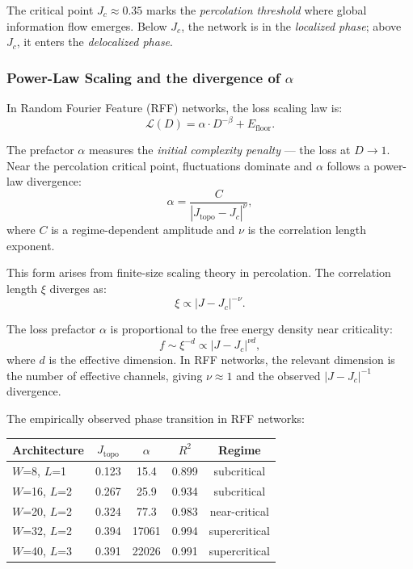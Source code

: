 The critical point $J_c \approx 0.35$ marks the \emph{percolation threshold} where global information flow emerges. Below $J_c$, the network is in the \emph{localized phase}; above $J_c$, it enters the \emph{delocalized phase}.

\subsubsection{Power-Law Scaling and the divergence of $\alpha$}

In Random Fourier Feature (RFF) networks, the loss scaling law is:
\begin{equation}
\mathcal{L}(D) = \alpha \cdot D^{-\beta} + E_{\mathrm{floor}}.
\end{equation}

The prefactor $\alpha$ measures the \emph{initial complexity penalty} --- the loss at $D \to 1$. Near the percolation critical point, fluctuations dominate and $\alpha$ follows a power-law divergence:
\begin{equation}
\alpha = \frac{C}{|J_{\mathrm{topo}} - J_c|^{\nu}},
\end{equation}
where $C$ is a regime-dependent amplitude and $\nu$ is the correlation length exponent.

This form arises from finite-size scaling theory in percolation. The correlation length $\xi$ diverges as:
\begin{equation}
\xi \propto |J - J_c|^{-\nu}.
\end{equation}

The loss prefactor $\alpha$ is proportional to the free energy density near criticality:
\begin{equation}
f \sim \xi^{-d} \propto |J - J_c|^{\nu d},
\end{equation}
where $d$ is the effective dimension. In RFF networks, the relevant dimension is the number of effective channels, giving $\nu \approx 1$ and the observed $|J - J_c|^{-1}$ divergence.

The empirically observed phase transition in RFF networks:
\begin{center}
\begin{tabular}{lcccc}
\toprule
Architecture & $J_{\mathrm{topo}}$ & $\alpha$ & $R^2$ & Regime \\
\midrule
$W$=8, $L$=1 & 0.123 & 15.4 & 0.899 & subcritical \\
$W$=16, $L$=2 & 0.267 & 25.9 & 0.934 & subcritical \\
$W$=20, $L$=2 & 0.324 & 77.3 & 0.983 & near-critical \\
$W$=32, $L$=2 & 0.394 & 17061 & 0.994 & supercritical \\
$W$=40, $L$=3 & 0.391 & 22026 & 0.991 & supercritical \\
\bottomrule
\end{tabular}
\end{center}

